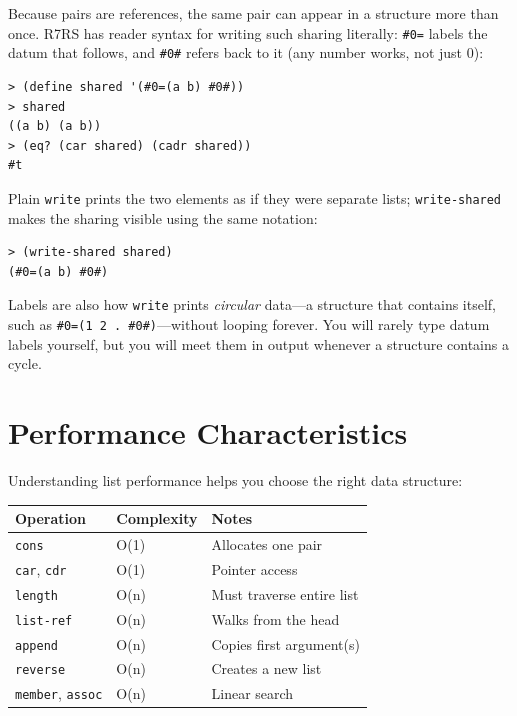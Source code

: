 \begin{note}
Because pairs are references, the same pair can appear in a structure more than once. R7RS has reader syntax for writing such sharing literally: \texttt{\#0=} labels the datum that follows, and \texttt{\#0\#} refers back to it (any number works, not just 0):

\begin{lstlisting}[style=repl]
> (define shared '(#0=(a b) #0#))
> shared
((a b) (a b))
> (eq? (car shared) (cadr shared))
#t
\end{lstlisting}

Plain \texttt{write} prints the two elements as if they were separate lists; \texttt{write-shared} makes the sharing visible using the same notation:

\begin{lstlisting}[style=repl]
> (write-shared shared)
(#0=(a b) #0#)
\end{lstlisting}

Labels are also how \texttt{write} prints \emph{circular} data---a structure that contains itself, such as \texttt{\#0=(1 2 . \#0\#)}---without looping forever. You will rarely type datum labels yourself, but you will meet them in output whenever a structure contains a cycle.
\end{note}

\section{Performance Characteristics}

Understanding list performance helps you choose the right data structure:

\begin{center}
\begin{tabular}{lll}
\textbf{Operation} & \textbf{Complexity} & \textbf{Notes} \\
\hline
\texttt{cons} & O(1) & Allocates one pair \\
\texttt{car}, \texttt{cdr} & O(1) & Pointer access \\
\texttt{length} & O(n) & Must traverse entire list \\
\texttt{list-ref} & O(n) & Walks from the head \\
\texttt{append} & O(n) & Copies first argument(s) \\
\texttt{reverse} & O(n) & Creates a new list \\
\texttt{member}, \texttt{assoc} & O(n) & Linear search \\
\end{tabular}
\end{center}

